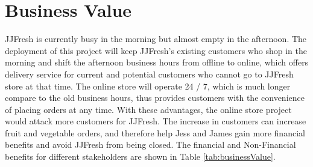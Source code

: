 \documentclass{report}
\begin{document}
\section{Business Value}
\label{sec:businessValue}
JJFresh is currently busy in the morning but almost empty in the afternoon. The deployment of this project will keep JJFresh's existing customers who shop in the morning and shift the afternoon business hours from offline to online, which offers delivery service for current and potential customers who cannot go to JJFresh store at that time. The online store will operate 24 / 7, which is much longer compare to the old business hours, thus provides customers with the convenience of placing orders at any time. With these advantages, the online store project would attack more customers for JJFresh. The increase in customers can increase fruit and vegetable orders, and therefore help Jess and James gain more financial benefits and avoid JJFresh from being closed. The financial and Non-Financial benefits for different stakeholders are shown in Table \ref{tab:businessValue}.
\end{document}
